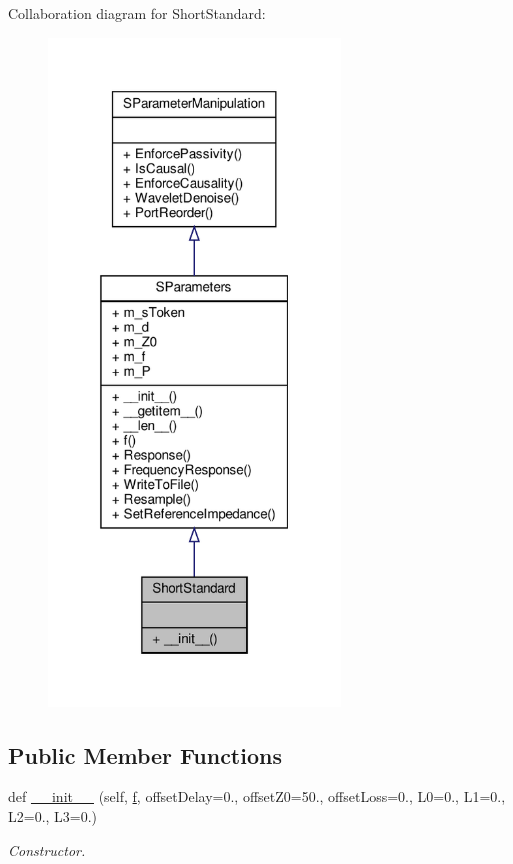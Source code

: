 Collaboration diagram for Short\+Standard\+:
\nopagebreak
\begin{figure}[H]
\begin{center}
\leavevmode
\includegraphics[width=220pt]{classSignalIntegrity_1_1Measurement_1_1CalKit_1_1Standards_1_1ShortStandard_1_1ShortStandard__coll__graph}
\end{center}
\end{figure}
\subsection*{Public Member Functions}
\begin{DoxyCompactItemize}
\item 
def \hyperlink{classSignalIntegrity_1_1Measurement_1_1CalKit_1_1Standards_1_1ShortStandard_1_1ShortStandard_a18ad2ab7b5864b09d3eb97b6dcddd8dd}{\+\_\+\+\_\+init\+\_\+\+\_\+} (self, \hyperlink{classSignalIntegrity_1_1SParameters_1_1SParameters_1_1SParameters_a32e7a34d6837fe949b413c852a0447f8}{f}, offset\+Delay=0., offset\+Z0=50., offset\+Loss=0., L0=0., L1=0., L2=0., L3=0.)
\begin{DoxyCompactList}\small\item\em Constructor. \end{DoxyCompactList}\end{DoxyCompactItemize}


